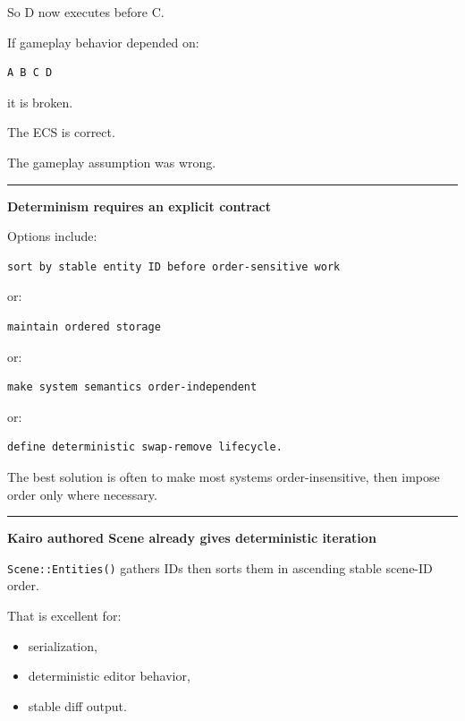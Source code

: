So D now executes before C.

If gameplay behavior depended on:

\begin{verbatim}
A B C D
\end{verbatim}

it is broken.

The ECS is correct.

The gameplay assumption was wrong.

\begin{center}\rule{0.5\linewidth}{0.5pt}\end{center}

\textbf{Determinism requires an explicit contract}

Options include:

\begin{verbatim}
sort by stable entity ID before order-sensitive work
\end{verbatim}

or:

\begin{verbatim}
maintain ordered storage
\end{verbatim}

or:

\begin{verbatim}
make system semantics order-independent
\end{verbatim}

or:

\begin{verbatim}
define deterministic swap-remove lifecycle.
\end{verbatim}

The best solution is often to make most systems order-insensitive, then impose order only where necessary.

\begin{center}\rule{0.5\linewidth}{0.5pt}\end{center}

\textbf{Kairo authored Scene already gives deterministic iteration}

\texttt{Scene::Entities()} gathers IDs then sorts them in ascending stable scene-ID order.

That is excellent for:

\begin{itemize}
\tightlist
\item
  serialization,
\item
  deterministic editor behavior,
\item
  stable diff output.
\end{itemize}

